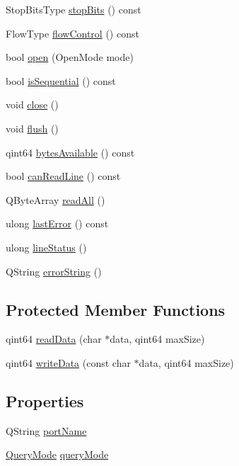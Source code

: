 \begin{DoxyCompactItemize}
Stop\+Bits\+Type \hyperlink{classQextSerialPort_a9a135f5caefdad23e1a2dbd7ce7b8731}{stop\+Bits} () const
\item 
Flow\+Type \hyperlink{classQextSerialPort_ae4c4bf79d59ed28be336e020b7459b93}{flow\+Control} () const
\item 
bool \hyperlink{classQextSerialPort_a86720bd25b34082c1270b7e42c2216a0}{open} (Open\+Mode mode)
\item 
bool \hyperlink{classQextSerialPort_ac4b945aa423d599af3b16839247cb711}{is\+Sequential} () const
\item 
void \hyperlink{classQextSerialPort_a11eb2a959708db24cdb0de62e10fb1c0}{close} ()
\item 
void \hyperlink{classQextSerialPort_ac7448603fb4601540c4b6fc999c953e7}{flush} ()
\item 
qint64 \hyperlink{classQextSerialPort_a7a3d641c3cd4810f9f70c4c86c2fc5e7}{bytes\+Available} () const
\item 
bool \hyperlink{classQextSerialPort_adafee990c20d75276a9c94ad221cd851}{can\+Read\+Line} () const
\item 
Q\+Byte\+Array \hyperlink{classQextSerialPort_a5ea5a8f38a40490e655231bd083ca51d}{read\+All} ()
\item 
ulong \hyperlink{classQextSerialPort_a1061dbec6478575545cd94ed88ba17ca}{last\+Error} () const
\item 
ulong \hyperlink{classQextSerialPort_a6d12bc6daa415f347e4929f6726fbe5d}{line\+Status} ()
\item 
Q\+String \hyperlink{classQextSerialPort_aaafe63e85bf7e47ed8442be686e3d262}{error\+String} ()
\end{DoxyCompactItemize}
\subsection*{Protected Member Functions}
\begin{DoxyCompactItemize}
\item 
qint64 \hyperlink{classQextSerialPort_a7bcf7ba45f4c02607ceca83d00f9def4}{read\+Data} (char $\ast$data, qint64 max\+Size)
\item 
qint64 \hyperlink{classQextSerialPort_a23b32aebe729afd58d7ba6e409d29d1f}{write\+Data} (const char $\ast$data, qint64 max\+Size)
\end{DoxyCompactItemize}
\subsection*{Properties}
\begin{DoxyCompactItemize}
\item 
Q\+String \hyperlink{classQextSerialPort_a989fbac088b18152af0b736a71b9155b}{port\+Name}
\item 
\hyperlink{classQextSerialPort_a6002128d7351ea9a958d6a6d1fc6b9bd}{Query\+Mode} \hyperlink{classQextSerialPort_a22867092a82eb015ad6f84fd4ade1073}{query\+Mode}
\end{DoxyCompactItemize}


